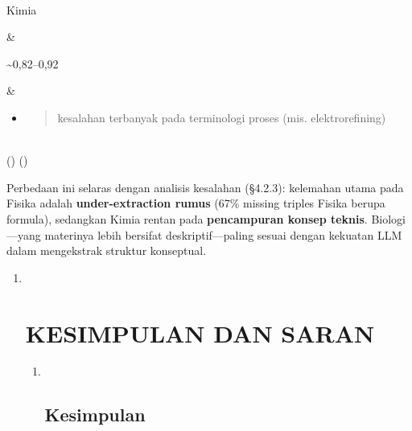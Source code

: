 \documentclass[
]{article}
\begin{document}
\begin{longtable}[]
\begin{minipage}[b]{\linewidth}
\begin{itemize}
\end{itemize}
\end{minipage} \\
\begin{minipage}[b]{\linewidth}\raggedright
Kimia
\end{minipage} & \begin{minipage}[b]{\linewidth}\raggedright
\textasciitilde0,82--0,92
\end{minipage} & \begin{minipage}[b]{\linewidth}\raggedright
\begin{itemize}
\item
  \begin{quote}
  kesalahan terbanyak pada terminologi proses (mis. elektrorefining)
  \end{quote}
\end{itemize}
\end{minipage} \\
\midrule()
\endhead
\bottomrule()
\end{longtable}

Perbedaan ini selaras dengan analisis kesalahan (§4.2.3): kelemahan
utama pada Fisika adalah \textbf{under-extraction rumus} (67\% missing
triples Fisika berupa formula), sedangkan Kimia rentan pada
\textbf{pencampuran konsep teknis}. Biologi---yang materinya lebih
bersifat deskriptif---paling sesuai dengan kekuatan LLM dalam
mengekstrak struktur konseptual.

\begin{enumerate}
\def\labelenumi{\arabic{enumi}.}
\setcounter{enumi}{4}
\item ~
  \hypertarget{kesimpulan-dan-saran}{%
  \section{\texorpdfstring{\hfill\break
  KESIMPULAN DAN
  SARAN}{ KESIMPULAN DAN SARAN}}\label{kesimpulan-dan-saran}}

  \begin{enumerate}
  \def\labelenumii{\arabic{enumii}.}
  \item ~
    \hypertarget{kesimpulan}{%
    \subsection{\texorpdfstring{Kesimpulan
    }{Kesimpulan }}\label{kesimpulan}}
  \end{enumerate}
\end{enumerate}
\end{document}
